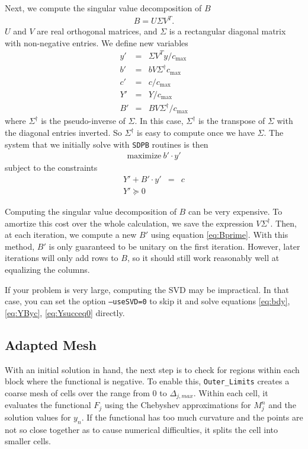 \documentclass[12pt]{article}
\numberwithin{equation}{section}
\begin{document}
Next, we compute the singular value decomposition of $B$
\begin{eqnarray}
  B = U \Sigma V^T.
\end{eqnarray}
$U$ and $V$ are real orthogonal matrices, and $\Sigma$ is a rectangular
diagonal matrix with non-negative entries.  We define new
variables
\begin{eqnarray}
  y' & = & \Sigma V^T y/c_{\max}\\
  b' & = & b V \Sigma^{\dagger}c_{\max}\\
  c' & = & c/c_{\max}\\
  Y' & = & Y/c_{\max}\\
  B' & = & B V \Sigma^{\dagger}/c_{\max}
           \label{eq:Bprime}
\end{eqnarray}
where $\Sigma^{\dagger}$ is the pseudo-inverse of $\Sigma$.  In this
case, $\Sigma^{\dagger}$ is the transpose of $\Sigma$ with the
diagonal entries inverted.  So $\Sigma^{\dagger}$ is easy to compute
once we have $\Sigma$.  The system that we initially solve with
\texttt{SDPB} routines is then
\begin{eqnarray}
  \textrm{maximize}~b'\cdot y'
\end{eqnarray}
subject to the constraints
\begin{eqnarray}
  Y' + B'\cdot y' & = & c\\
  Y' \succeq 0
\end{eqnarray}

Computing the singular value decomposition of $B$ can be very
expensive.  To amortize this cost over the whole calculation, we
save the expression $V \Sigma^{\dagger}$.  Then, at each iteration, we
compute a new $B'$ using equation \ref{eq:Bprime}.  With this method,
$B'$ is only guaranteed to be unitary on the first iteration.
However, later iterations will only add rows to $B$, so it should
still work reasonably well at equalizing the columns.

If your problem is very large, computing the SVD may be impractical.
In that case, you can set the option \texttt{--useSVD=0} to skip it
and solve equations \ref{eq:bdy}, \ref{eq:YByc}, \ref{eq:Ysucceq0}
directly.

\subsection{Adapted Mesh}
\label{subsec:adaptedmesh}

With an initial solution in hand, the next step is to check for
regions within each block where the functional is negative.  To enable
this, \texttt{Outer\_Limits} creates a coarse mesh of
cells over the range from $0$ to $\Delta_{j,max}$.  Within each cell,
it evaluates the functional $F_j$ using the Chebyshev approximations
for $M_j^n$ and the solution values for $y_n$.  If the functional has
too much curvature and the points are not so close together as to
cause numerical difficulties, it splits the cell into smaller cells.
\end{document}
